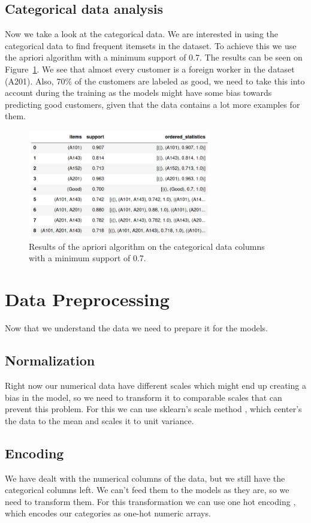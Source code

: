 \documentclass[runningheads]{llncs}
\begin{document}
\subsection{Categorical data analysis}

Now we take a look at the categorical data. We are interested in using the categorical data to find frequent itemsets in the dataset. To achieve this we use the apriori \cite{apriori} algorithm with a minimum support of 0.7. The results can be seen on Figure~\ref{apriori}. We see that almost every customer is a foreign worker in the dataset (A201). Also, 70\% of the customers are labeled as good, we need to take this into account during the training as the models might have some bias towards predicting good customers, given that the data contains a lot more examples for them. 

\begin{figure}
\includegraphics[width=8cm]{images/frequent_items.png}
\centering
\caption{Results of the apriori algorithm on the categorical data columns with a minimum support of 0.7.}
\label{apriori}
\end{figure}

\section{Data Preprocessing}

Now that we understand the data we need to prepare it for the models.

\subsection{Normalization}
Right now our numerical data have different scales which might end up creating a bias in the model, so we need to transform it to comparable scales that can prevent this problem. For this we can use sklearn's scale method \cite{sklearn_scale}, which center's the data to the mean and scales it to unit variance.

\subsection{Encoding}
We have dealt with the numerical columns of the data, but we still have the categorical columns left. We can't feed them to the models as they are, so we need to transform them. For this transformation we can use one hot encoding \cite{sklearn_one_hot_encoder}, which encodes our categories as one-hot numeric arrays.
\end{document}
